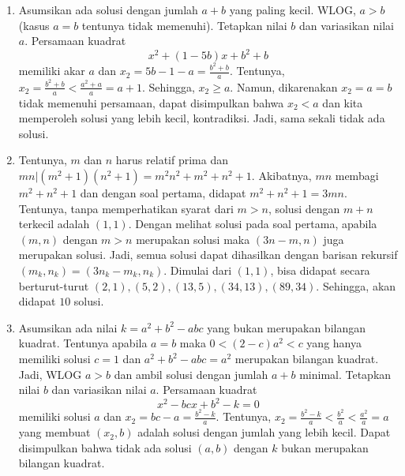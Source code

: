 \documentclass[11pt]{scrartcl}
\begin{document}
\begin{enumerate}
    Asumsikan ada solusi $(m, n)$ dengan $\frac{m}{n} + \frac{n}{m} = k > 2$. WLOG, $m > n$. Tinjau solusi dengan jumlah terkecil. Tetapkan nilai $n$ dan variasikan nilai $m$. Dengan menyusun ulang persamaan, didapat persamaan kuadrat \[x^2 - kxn + n^2 = 0.\] Misal $x_2$ adalah akar salah satunya lagi. Amati bahwa $x_2 = kx - m = \frac{n^2}{m}$. Tentunya, $x_2 =\frac{n^2}{m} < \frac{m^2}{m} = m$ yang membuat $(x_2, n)$ adalah solusi dengan jumlah yang lebih kecil. Sehingga, terjadi kontradiksi dan $k$ harus sama dengan $2$.
    \item Asumsikan ada solusi dengan jumlah $a + b$ yang paling kecil. WLOG, $a > b$ (kasus $a = b$ tentunya tidak memenuhi). Tetapkan nilai $b$ dan variasikan nilai $a$. Persamaan kuadrat \[x^2 + (1 - 5b)x + b^2 + b\] memiliki akar $a$ dan $x_2 = 5b - 1 - a = \frac{b^2 + b}{a}$. Tentunya, $x_2 = \frac{b^2 + b}{a} < \frac{a^2 + a}{a} = a + 1$. Sehingga, $x_2 \geq a$. Namun, dikarenakan $x_2 = a = b$ tidak memenuhi persamaan, dapat disimpulkan bahwa $x_2 < a$ dan kita memperoleh solusi yang lebih kecil, kontradiksi. Jadi, sama sekali tidak ada solusi.
    \item Tentunya, $m$ dan $n$ harus relatif prima dan $mn|(m^2 + 1)(n^2 + 1) = m^2n^2 + m^2 + n^2 +1$. Akibatnya, $mn$ membagi $m^2 + n^2 + 1$ dan dengan soal pertama, didapat $m^2 + n^2 + 1 = 3mn$. Tentunya, tanpa memperhatikan syarat dari $m > n$, solusi dengan $m + n$ terkecil adalah $(1, 1)$. Dengan melihat solusi pada soal pertama, apabila $(m, n)$ dengan $m > n$ merupakan solusi maka $(3n - m, n)$ juga merupakan solusi. Jadi, semua solusi dapat dihasilkan dengan barisan rekursif $(m_k, n_k) = (3n_k - m_k, n_k)$. Dimulai dari $(1, 1)$, bisa didapat secara berturut-turut $(2, 1), (5, 2), (13, 5), (34, 13), (89, 34)$. Sehingga, akan didapat $10$ solusi.
    \item Asumsikan ada nilai $k = a^2 + b^2 - abc$ yang bukan merupakan bilangan kuadrat. Tentunya apabila $a = b$ maka $0 < (2 - c)a^2 < c$ yang hanya memiliki solusi $c = 1$ dan $a^2 + b^2 - abc = a^2$ merupakan bilangan kuadrat. Jadi, WLOG $a > b$ dan ambil solusi dengan jumlah $a + b$ minimal. Tetapkan nilai $b$ dan variasikan nilai $a$. Persamaan kuadrat \[x^2 - bcx + b^2 -k = 0\] memiliki solusi $a$ dan $x_2 = bc - a = \frac{b^2 - k}{a}$. Tentunya, $x_2 = \frac{b^2 - k}{a} < \frac{b^2}{a} < \frac{a^2}{a} = a$ yang membuat $(x_2, b)$ adalah solusi dengan jumlah yang lebih kecil. Dapat disimpulkan bahwa tidak ada solusi $(a, b)$ dengan $k$ bukan merupakan bilangan kuadrat.

\end{enumerate}
\end{document}
